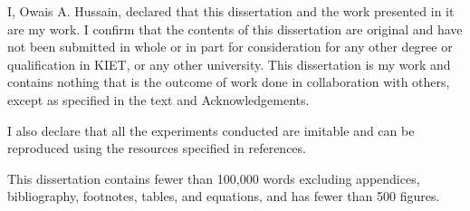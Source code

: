 
\begin{declaration}

I, Owais A. Hussain, declared that this dissertation and the work presented in it are my work. I confirm that the contents of this dissertation are original and have not been submitted in whole or in part for consideration for any other degree or qualification in KIET, or any other university. This dissertation is my work and contains nothing that is the outcome of work done in collaboration with others, except as specified in the text and Acknowledgements.

I also declare that all the experiments conducted are imitable and can be reproduced using the resources specified in references.

This dissertation contains fewer than 100,000 words excluding appendices, bibliography, footnotes, tables, and equations, and has fewer than 500 figures.


\end{declaration}
